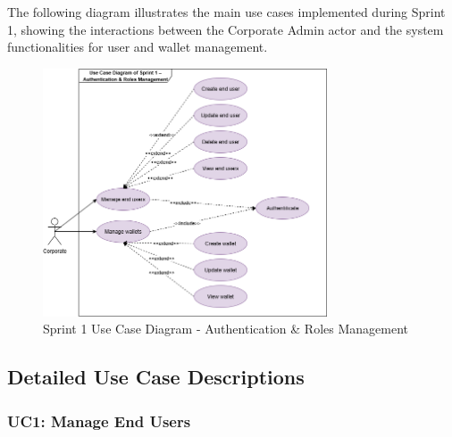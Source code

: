 The following diagram illustrates the main use cases implemented during Sprint 1, showing the interactions between the Corporate Admin actor and the system functionalities for user and wallet management.

\begin{figure}[H]
  \centering
  \includegraphics[width=0.75\textwidth]{images/usecase_sprint1.png}
  \caption{Sprint 1 Use Case Diagram - Authentication \& Roles Management}
  \label{fig:sprint1_usecase_diagram}
\end{figure}

\subsection{Detailed Use Case Descriptions}

\subsubsection{UC1: Manage End Users}

